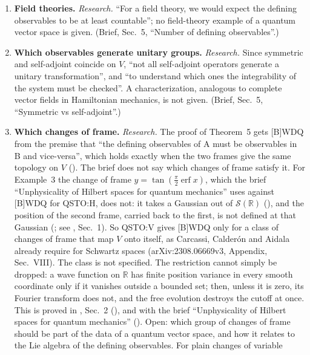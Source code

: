 \documentclass[11pt]{article}
\begin{document}
\begin{enumerate}
\item \textbf{Field theories.} \emph{Research.} ``For a field theory, we would expect
  the defining observables to be at least countable''; no field-theory example of a quantum
  vector space is given. (Brief, Sec.~5, ``Number of defining observables''.)
\item \textbf{Which observables generate unitary groups.} \emph{Research.} Since
  symmetric and self-adjoint coincide on $V$, ``not all self-adjoint operators generate a unitary
  transformation'', and ``to understand which ones the integrability of the system must be
  checked''. A characterization, analogous to complete vector fields in Hamiltonian mechanics, is
  not given.
  (Brief, Sec.~5, ``Symmetric vs self-adjoint''.)
\item \textbf{Which changes of frame.} \emph{Research.} The proof of Theorem~5 gets [B]WDQ
  from the premise that ``the defining observables of A must be observables in B and
  vice-versa'', which holds exactly when the two frames give the same topology on $V$
  (). The brief does not say which changes of frame satisfy it.
  For Example~3 the change of frame $y = \tan(\frac{\pi}{2}\operatorname{erf} x)$, which the
  brief ``Unphysicality of Hilbert spaces for quantum mechanics'' uses against [B]WDQ for
  QSTO:H, does not: it takes a Gaussian out of $\mathcal{S}(\mathbb{R})$
  (), and the position of the second frame,
  carried back to the first, is not defined at that Gaussian
  (; see , Sec.~1). So QSTO:V gives [B]WDQ only for a
  class of changes of frame that map $V$ onto itself, as Carcassi, Calder\'on and Aidala already
  require for Schwartz spaces (arXiv:2308.06669v3, Appendix, Sec.~VIII). The class is not
  specified. The restriction cannot simply be dropped: a wave function on $\mathbb{R}$ has finite position
  variance in every smooth coordinate only if it vanishes outside a bounded set; then, unless it
  is zero, its Fourier transform does not, and the free evolution destroys the cutoff at once.
  This is proved in , Sec.~2
  (), and with the
  brief ``Unphysicality of Hilbert spaces for quantum mechanics''
  (). Open:
  which group of changes of frame should be part of the data of a quantum vector space, and how
  it relates to the Lie algebra of the defining observables. For plain changes of variable

\end{enumerate}
\end{document}
